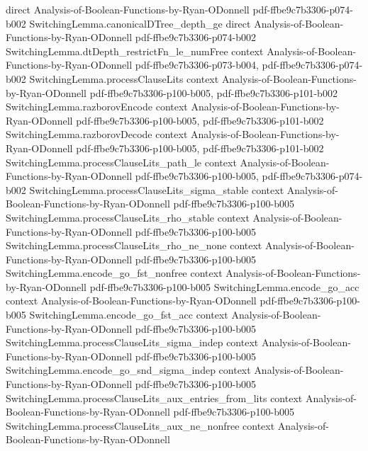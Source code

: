 \begin{lemma}
  {direct}
  {Analysis-of-Boolean-Functions-by-Ryan-ODonnell}
  {pdf-ffbe9c7b3306-p074-b002}
\proofstep
  {SwitchingLemma.canonicalDTree_depth_ge}
  {direct}
  {Analysis-of-Boolean-Functions-by-Ryan-ODonnell}
  {pdf-ffbe9c7b3306-p074-b002}
\proofstep
  {SwitchingLemma.dtDepth_restrictFn_le_numFree}
  {context}
  {Analysis-of-Boolean-Functions-by-Ryan-ODonnell}
  {pdf-ffbe9c7b3306-p073-b004,
    pdf-ffbe9c7b3306-p074-b002}
\proofstep
  {SwitchingLemma.processClauseLits}
  {context}
  {Analysis-of-Boolean-Functions-by-Ryan-ODonnell}
  {pdf-ffbe9c7b3306-p100-b005,
    pdf-ffbe9c7b3306-p101-b002}
\proofstep
  {SwitchingLemma.razborovEncode}
  {context}
  {Analysis-of-Boolean-Functions-by-Ryan-ODonnell}
  {pdf-ffbe9c7b3306-p100-b005,
    pdf-ffbe9c7b3306-p101-b002}
\proofstep
  {SwitchingLemma.razborovDecode}
  {context}
  {Analysis-of-Boolean-Functions-by-Ryan-ODonnell}
  {pdf-ffbe9c7b3306-p100-b005,
    pdf-ffbe9c7b3306-p101-b002}
\proofstep
  {SwitchingLemma.processClauseLits_path_le}
  {context}
  {Analysis-of-Boolean-Functions-by-Ryan-ODonnell}
  {pdf-ffbe9c7b3306-p100-b005,
    pdf-ffbe9c7b3306-p074-b002}
\proofstep
  {SwitchingLemma.processClauseLits_sigma_stable}
  {context}
  {Analysis-of-Boolean-Functions-by-Ryan-ODonnell}
  {pdf-ffbe9c7b3306-p100-b005}
\proofstep
  {SwitchingLemma.processClauseLits_rho_stable}
  {context}
  {Analysis-of-Boolean-Functions-by-Ryan-ODonnell}
  {pdf-ffbe9c7b3306-p100-b005}
\proofstep
  {SwitchingLemma.processClauseLits_rho_ne_none}
  {context}
  {Analysis-of-Boolean-Functions-by-Ryan-ODonnell}
  {pdf-ffbe9c7b3306-p100-b005}
\proofstep
  {SwitchingLemma.encode_go_fst_nonfree}
  {context}
  {Analysis-of-Boolean-Functions-by-Ryan-ODonnell}
  {pdf-ffbe9c7b3306-p100-b005}
\proofstep
  {SwitchingLemma.encode_go_acc}
  {context}
  {Analysis-of-Boolean-Functions-by-Ryan-ODonnell}
  {pdf-ffbe9c7b3306-p100-b005}
\proofstep
  {SwitchingLemma.encode_go_fst_acc}
  {context}
  {Analysis-of-Boolean-Functions-by-Ryan-ODonnell}
  {pdf-ffbe9c7b3306-p100-b005}
\proofstep
  {SwitchingLemma.processClauseLits_sigma_indep}
  {context}
  {Analysis-of-Boolean-Functions-by-Ryan-ODonnell}
  {pdf-ffbe9c7b3306-p100-b005}
\proofstep
  {SwitchingLemma.encode_go_snd_sigma_indep}
  {context}
  {Analysis-of-Boolean-Functions-by-Ryan-ODonnell}
  {pdf-ffbe9c7b3306-p100-b005}
\proofstep
  {SwitchingLemma.processClauseLits_aux_entries_from_lits}
  {context}
  {Analysis-of-Boolean-Functions-by-Ryan-ODonnell}
  {pdf-ffbe9c7b3306-p100-b005}
\proofstep
  {SwitchingLemma.processClauseLits_aux_ne_nonfree}
  {context}
  {Analysis-of-Boolean-Functions-by-Ryan-ODonnell}

\end{lemma}
